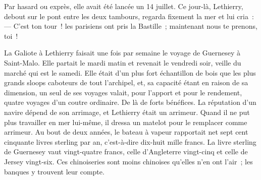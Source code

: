 \documentclass[french,twoside]{book} %
\begin{document}
Par hasard ou exprès, elle avait été lancée un 14 juillet. Ce jour-là, Lethierry, debout sur le pont entre les deux tambours, regarda fixement la mer et lui cria : — C’est ton tour ! les parisiens ont pris la Bastille ; maintenant nous te prenons, toi !\par
La Galiote à Lethierry faisait une fois par semaine le voyage de Guernesey à Saint-Malo. Elle partait le mardi matin et revenait le vendredi soir, veille du marché qui est le samedi. Elle était d’un plus fort échantillon de bois que les plus grands sloops caboteurs de tout l’archipel, et, sa capacité étant en raison de sa dimension, un seul de ses voyages valait, pour l’apport et pour le rendement, quatre voyages d’un coutre ordinaire. De là de forts bénéfices. La réputation d’un navire dépend de son arrimage, et Lethierry était un  arrimeur. Quand il ne put plus travailler en mer lui-même, il dressa un matelot pour le remplacer comme arrimeur. Au bout de deux années, le bateau à vapeur rapportait net sept cent cinquante livres sterling par an, c’est-à-dire dix-huit mille francs. La livre sterling de Guernesey vaut vingt-quatre francs, celle d’Angleterre vingt-cinq et celle de Jersey vingt-six. Ces chinoiseries sont moins chinoises qu’elles n’en ont l’air ; les banques y trouvent leur compte.
\end{document}
